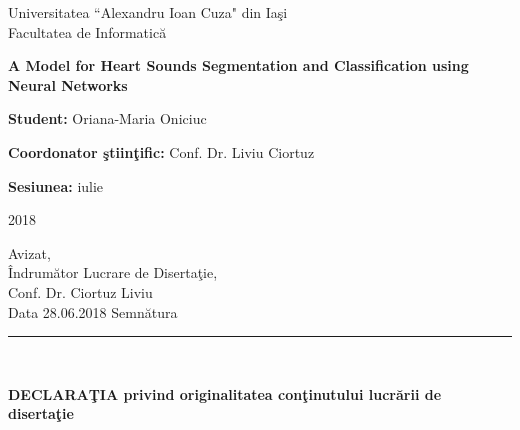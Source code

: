 \documentclass[11pt, a4papper]{report}
\theoremstyle{plain}
\theoremstyle{definition}
\theoremstyle{definition}
\theoremstyle{proposition}
\begin{document}
\begin{titlepage}

\begin{center}
Universitatea ``Alexandru Ioan Cuza" din Iaşi\\
Facultatea de Informatică\\
\end{center}

\vspace{85mm}
 
\begin{center}
\begin{Huge}
\textbf{A Model for Heart Sounds Segmentation and
Classification using Neural Networks}
\end{Huge}
\end{center}
 
\vspace{60mm}

\textbf{Student:} Oriana-Maria Oniciuc

\textbf{Coordonator ştiinţific:} Conf. Dr. Liviu Ciortuz

\vfill

\begin{center}
\textbf{Sesiunea:} iulie

2018
\end{center}

\end{titlepage}

\newpage

\setcounter{page}{2}

\begin{flushright}
Avizat,\\
\^Indrum\u ator Lucrare de Diserta\c tie,\\
Conf. Dr. Ciortuz Liviu
\\

Data 28.06.2018 \hspace{0.4cm} Semn\u atura \rule{3.5cm}{0.4pt}
\end{flushright}
\

\begin{center}
\textbf{DECLARA\c TIA privind originalitatea con\c tinutului lucr\u arii de diserta\c tie}
\end{center}
\
\end{document}
